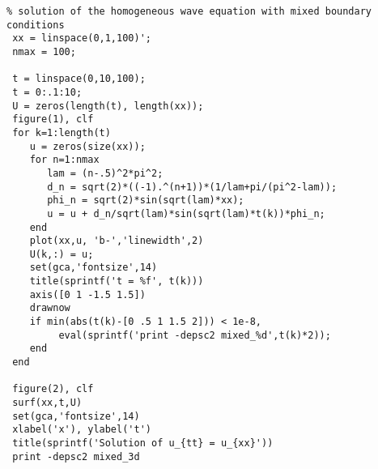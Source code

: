 {\footnotesize
\begin{verbatim}
% solution of the homogeneous wave equation with mixed boundary conditions
 xx = linspace(0,1,100)';
 nmax = 100;

 t = linspace(0,10,100);
 t = 0:.1:10;
 U = zeros(length(t), length(xx));
 figure(1), clf
 for k=1:length(t)
    u = zeros(size(xx));
    for n=1:nmax
       lam = (n-.5)^2*pi^2;
       d_n = sqrt(2)*((-1).^(n+1))*(1/lam+pi/(pi^2-lam));
       phi_n = sqrt(2)*sin(sqrt(lam)*xx);
       u = u + d_n/sqrt(lam)*sin(sqrt(lam)*t(k))*phi_n;
    end
    plot(xx,u, 'b-','linewidth',2)
    U(k,:) = u;
    set(gca,'fontsize',14)
    title(sprintf('t = %f', t(k)))
    axis([0 1 -1.5 1.5])
    drawnow
    if min(abs(t(k)-[0 .5 1 1.5 2])) < 1e-8,
         eval(sprintf('print -depsc2 mixed_%d',t(k)*2));
    end
 end

 figure(2), clf
 surf(xx,t,U)
 set(gca,'fontsize',14)
 xlabel('x'), ylabel('t')
 title(sprintf('Solution of u_{tt} = u_{xx}'))
 print -depsc2 mixed_3d
\end{verbatim}}

